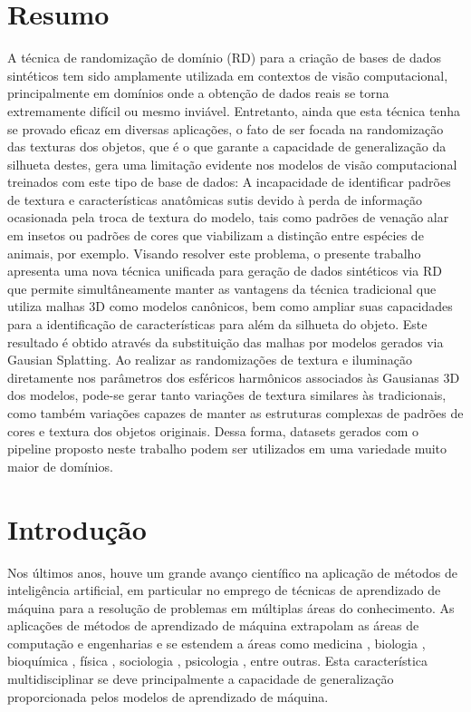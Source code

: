 \documentclass[a4paper,12pt]{article}
\begin{document}
\newpage


\tableofcontents

\newpage

\onehalfspacing
{
\section{Resumo}

A técnica de randomização de domínio (RD) para a criação de bases de dados sintéticos tem sido amplamente utilizada em contextos de visão computacional, principalmente em domínios onde a obtenção de dados reais se torna extremamente difícil ou mesmo inviável. Entretanto, ainda que esta técnica tenha se provado eficaz em diversas aplicações, o fato de ser focada na randomização das texturas dos objetos, que é o que garante a capacidade de generalização da silhueta destes, gera uma limitação evidente nos modelos de visão computacional treinados com este tipo de base de dados: A incapacidade de identificar padrões de textura e características anatômicas sutis devido à perda de informação ocasionada pela troca de textura do modelo, tais como padrões de venação alar em insetos ou padrões de cores que viabilizam a distinção entre espécies de animais, por exemplo. Visando resolver este problema, o presente trabalho apresenta uma nova técnica unificada para geração de dados sintéticos via RD que permite simultâneamente manter as vantagens da técnica tradicional que utiliza malhas 3D como modelos canônicos, bem como ampliar suas capacidades para a identificação de características para além da silhueta do objeto. Este resultado é obtido através da substituição das malhas por modelos gerados via Gausian Splatting. Ao realizar as randomizações de textura e iluminação diretamente nos parâmetros dos esféricos harmônicos associados às Gausianas 3D dos modelos, pode-se gerar tanto variações de textura similares às tradicionais, como também variações capazes de manter as estruturas complexas de padrões de cores e textura dos objetos originais. Dessa forma, datasets gerados com o pipeline proposto neste trabalho podem ser utilizados em uma variedade muito maior de domínios.

\section{Introdução}
Nos últimos anos, houve um grande avanço científico na aplicação de métodos de inteligência artificial, em particular no emprego de técnicas de aprendizado de máquina para a resolução de problemas em múltiplas áreas do conhecimento. As aplicações de métodos de aprendizado de máquina extrapolam as áreas de computação e engenharias e se estendem a áreas como medicina \cite{may2021eight}, biologia \cite{syen}, bioquímica \cite{mowbray2021machine}, física \cite{karniadakis2021physics}, sociologia \cite{di2021machine}, psicologia \cite{rosenbusch2021supervised}, entre outras. Esta característica multidisciplinar se deve principalmente a capacidade de generalização proporcionada pelos modelos de aprendizado de máquina.

}
\end{document}
